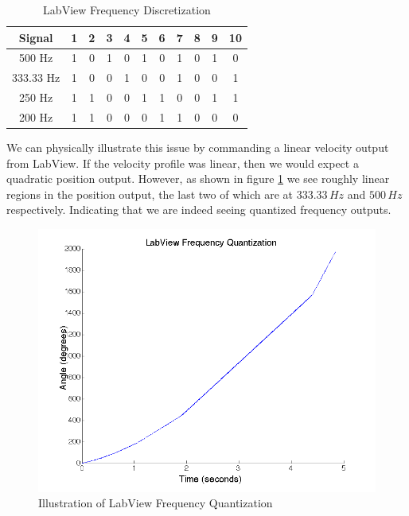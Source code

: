 \documentclass{article}
\theoremstyle{plain}
\theoremstyle{definition}
\theoremstyle{remark}
\begin{document}
\begin{table}
\begin{center}
    \begin{tabular}{|c|c|c|c|c|c|c|c|c|c|c|}
        \hline
        Signal    & 1 & 2 & 3 & 4 & 5 & 6 & 7 & 8 & 9 & 10 \\ \hline
        500 Hz    & 1 & 0 & 1 & 0 & 1 & 0 & 1 & 0 & 1 & 0  \\ 
        333.33 Hz & 1 & 0 & 0 & 1 & 0 & 0 & 1 & 0 & 0 & 1  \\ 
        250 Hz    & 1 & 1 & 0 & 0 & 1 & 1 & 0 & 0 & 1 & 1  \\ 
        200 Hz    & 1 & 1 & 0 & 0 & 0 & 1 & 1 & 0 & 0 & 0  \\
        \hline
    \end{tabular}
\caption{LabView Frequency Discretization}
\label{Q2_T2}
\end{center}
\end{table}

We can physically illustrate this issue by commanding a linear velocity output from LabView.  If the velocity profile was linear, then we would expect a quadratic position output.  However, as shown in figure \ref{Q2_3} we see roughly linear regions in the position output, the last two of which are at $333.33 \, Hz$ and $500 \, Hz$ respectively. Indicating that we are indeed seeing quantized frequency outputs.

\begin{figure}[hbt]
\begin{center}
\includegraphics[width = 13cm]{frequencyQuantization.png}
\caption{Illustration of LabView Frequency Quantization}
\label{Q2_3}
\end{center}
\end{figure}
\end{document}
